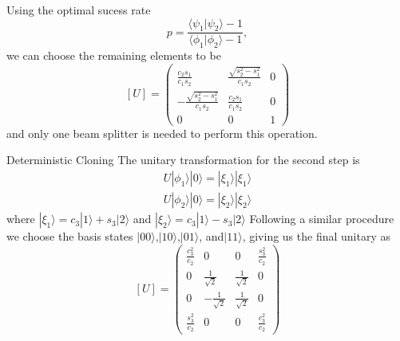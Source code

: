 \documentclass{beamer}
\newcommand{\ke}[1]{|#1\rangle}
\newcommand{\bk}[2]{\langle #1|#2\rangle}
\begin{document}
\begin{frame}
Using the optimal sucess rate 
\begin{equation}
p = \frac{\bk{\psi_1}{\psi_2}-1}{\bk{\phi_1}{\phi_2}-1},
\end{equation}
 we can choose the remaining elements to be
\begin{equation}
{}[U]=
\begin{pmatrix}\frac{c_2s_1}{c_1s_2}& \frac{\sqrt{s_2^2-s_1^2}}{c_1s_2} & 0\\
-\frac{\sqrt{s_2^2-s_1^2}}{c_1s_2} &\frac{c_2s_1}{c_1s_2} & 0 \\
0 & 0 & 1
\end{pmatrix}
\end{equation}
and only one beam splitter is needed to perform this operation.
\end{frame}
\begin{frame}{Deterministic Cloning}
The unitary transformation
for the second step is
\begin{eqnarray}
U\ke {\phi_1} \ke 0 = \ke{\xi_1}\ke{\xi_1}\\
U\ke {\phi_2} \ke 0 = \ke{\xi_2}\ke{\xi_2}
\end{eqnarray}
where 
$\ke {\xi_1} = c_3 \ke{1} + s_3 \ke{2}$ and
$\ke {\xi_2} = c_3 \ke{1} - s_3 \ke{2}$
Following a similar procedure we choose the basis states $ \ke {00}$,$ \ke {10}$,$ \ke {01}$, and$ \ke {11}$,
giving us the final unitary as 
\begin{equation}
{}[U]=
\begin{pmatrix} \frac{c_3^2}{c_2} &0 & 0 &\frac{s_3^2}{c_2}\\
0 &\frac{1}{\sqrt{2}} &\frac{1}{\sqrt{2}}&0 \\
0 &-\frac{1}{\sqrt{2}} &\frac{1}{\sqrt{2}}&0 \\
\frac{s_3^2}{c_2} & 0&0&\frac{c_3^2}{c_2}
\end{pmatrix}
\end{equation}
\end{frame}
\end{document}
